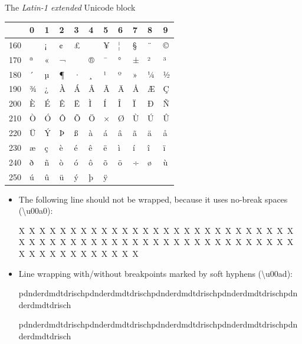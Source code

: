 \documentclass[a4paper]{article}
\newlength{\DUtablewidth} %
\providecommand*{\DUroletitlereference}[1]{\textsl{#1}}
\begin{document}
The \DUroletitlereference{Latin-1 extended} Unicode block

\setlength{\DUtablewidth}{\linewidth}
\begin{longtable*}[c]{|p{0.051\DUtablewidth}|p{0.028\DUtablewidth}|p{0.028\DUtablewidth}|p{0.028\DUtablewidth}|p{0.028\DUtablewidth}|p{0.028\DUtablewidth}|p{0.028\DUtablewidth}|p{0.028\DUtablewidth}|p{0.028\DUtablewidth}|p{0.028\DUtablewidth}|p{0.028\DUtablewidth}|}
\hline

% 
 & 
0
 & 
1
 & 
2
 & 
3
 & 
4
 & 
5
 & 
6
 & 
7
 & 
8
 & 
9
 \\
\hline

160
 &  & 
¡
 & 
¢
 & 
£
 &  & 
¥
 & 
¦
 & 
§
 & 
¨
 & 
©
 \\
\hline

170
 & 
ª
 & 
«
 & 
¬
 & 
\-
 & 
®
 & 
¯
 & 
°
 & 
±
 & 
²
 & 
³
 \\
\hline

180
 & 
´
 & 
µ
 & 
¶
 & 
·
 & 
¸
 & 
¹
 & 
º
 & 
»
 & 
¼
 & 
½
 \\
\hline

190
 & 
¾
 & 
¿
 & 
À
 & 
Á
 & 
Â
 & 
Ã
 & 
Ä
 & 
Å
 & 
Æ
 & 
Ç
 \\
\hline

200
 & 
È
 & 
É
 & 
Ê
 & 
Ë
 & 
Ì
 & 
Í
 & 
Î
 & 
Ï
 & 
Ð
 & 
Ñ
 \\
\hline

210
 & 
Ò
 & 
Ó
 & 
Ô
 & 
Õ
 & 
Ö
 & 
×
 & 
Ø
 & 
Ù
 & 
Ú
 & 
Û
 \\
\hline

220
 & 
Ü
 & 
Ý
 & 
Þ
 & 
ß
 & 
à
 & 
á
 & 
â
 & 
ã
 & 
ä
 & 
å
 \\
\hline

230
 & 
æ
 & 
ç
 & 
è
 & 
é
 & 
ê
 & 
ë
 & 
ì
 & 
í
 & 
î
 & 
ï
 \\
\hline

240
 & 
ð
 & 
ñ
 & 
ò
 & 
ó
 & 
ô
 & 
õ
 & 
ö
 & 
÷
 & 
ø
 & 
ù
 \\
\hline

250
 & 
ú
 & 
û
 & 
ü
 & 
ý
 & 
þ
 & 
ÿ
 &  &  &  &  \\
\hline
\end{longtable*}

\begin{itemize}
\item The following line should not be wrapped, because it uses
no-break spaces (\textbackslash{}u00a0):

X X X X X X X X X X X X X X X X X X X X X X X X X X X X X X X X X X X X X X X X X X X X X X X X X X X X X X X X X X X X X X X X X X

\item Line wrapping with/without breakpoints marked by soft hyphens
(\textbackslash{}u00ad):

pdn\-derd\-mdtd\-ri\-schpdn\-derd\-mdtd\-ri\-schpdn\-derd\-mdtd\-ri\-schpdn\-derd\-mdtd\-ri\-schpdn\-derd\-mdtd\-ri\-sch

pdnderdmdtdrischpdnderdmdtdrischpdnderdmdtdrischpdnderdmdtdrischpdnderdmdtdrisch
\end{itemize}
\end{document}
